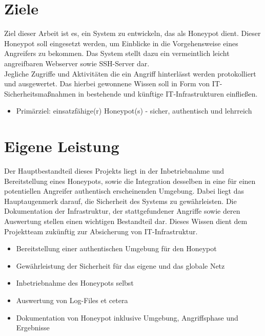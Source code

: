 \newpage


\section{Ziele}
\label{sec:Ziele}

Ziel dieser Arbeit ist es, ein System zu entwickeln, das als Honeypot dient. Dieser Honeypot soll eingesetzt werden, um Einblicke in die Vorgehensweise eines Angreifers zu bekommen. 
Das System stellt dazu ein vermeintlich leicht angreifbaren Webserver sowie SSH-Server dar.\\


Jegliche Zugriffe und Aktivitäten die ein Angriff hinterlässt werden protokolliert und ausgewertet. Das hierbei gewonnene Wissen soll in Form von IT-Sicherheitsmaßnahmen in bestehende und künftige IT-Infrastrukturen einfließen.

\begin{itemize}
\item Primärziel: einsatzfähige(r) Honeypot(s) - sicher, authentisch und lehrreich
\end{itemize}




\section{Eigene Leistung}
\label{sec:Eigene Leistung}

Der Hauptbestandteil dieses Projekts liegt in der Inbetriebnahme und Bereitstellung eines Honeypots, sowie die Integration desselben in eine für einen potentiellen Angreifer authentisch erscheinenden Umgebung. Dabei liegt das Hauptaugenmerk darauf, die Sicherheit des Systems zu gewährleisten. Die Dokumentation der Infrastruktur, der stattgefundener Angriffe sowie deren Auswertung stellen einen wichtigen Bestandteil dar. Dieses Wissen dient dem Projektteam zukünftig zur Absicherung von IT-Infrastruktur.

\begin{itemize}
\item Bereitstellung einer authentischen Umgebung für den Honeypot
\item Gewährleistung der Sicherheit für das eigene und das globale Netz
\item Inbetriebnahme des Honeypots selbst
\item Auswertung von Log-Files et cetera
\item Dokumentation von Honeypot inklusive Umgebung, Angriffsphase und Ergebnisse
\end{itemize}

